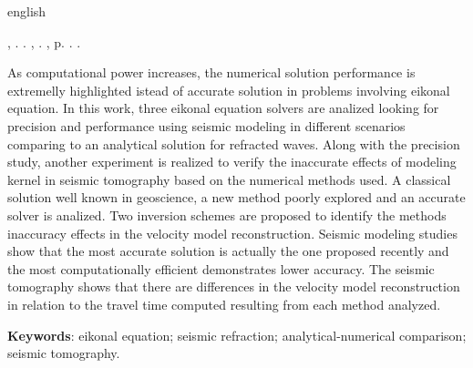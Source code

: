 \begin{resumo}[Abstract]
    \begin{otherlanguage*}{english}

\begin{flushleft}
\MakeUppercase{\imprimirSobrenome}, \imprimirPrimeirosNomes. \textbf{\imprimirTituloEmIngles}. \imprimirtipotrabalhoIngles, \imprimirinstituicaoIngles. \imprimirlocal,  p. \pageref{LastPage}. \imprimirAnoDeDefesa.
\end{flushleft}

        \fonteResumo
        As computational power increases, the numerical solution performance is extremelly highlighted istead of accurate solution in problems involving eikonal equation. In this work, three eikonal equation solvers are analized looking for precision and performance using seismic modeling in different scenarios comparing to an analytical solution for refracted waves. Along with the precision study, another experiment is realized to verify the inaccurate effects of modeling kernel in seismic tomography based on the numerical methods used. A classical solution well known in geoscience, a new method poorly explored and an accurate solver is analized. Two inversion schemes are proposed to identify the methods inaccuracy effects in the velocity model reconstruction. Seismic modeling studies show that the most accurate solution is actually the one proposed recently and the most computationally efficient demonstrates lower accuracy. The seismic tomography shows that there are differences in the velocity model reconstruction in relation to the travel time computed resulting from each method analyzed.     
    
        \vspace{\onelineskip}
     
        \noindent 
        \textbf{Keywords}: eikonal equation; seismic refraction; analytical-numerical comparison; seismic tomography.
    \end{otherlanguage*}
\end{resumo}
